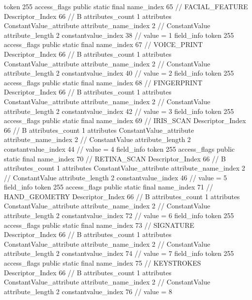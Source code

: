 {{{{{				token	255
				access_flags	public static final
				name_index	65		// FACIAL_FEATURE
				Descriptor_Index	66		// B
				attributes_count	1
				attributes {
				ConstantValue_attribute {
					attribute_name_index	2		// ConstantValue
					attribute_length	2
					constantvalue_index	38		// value = 1
				}
				}
			}
			field_info {
				token	255
				access_flags	public static final
				name_index	67		// VOICE_PRINT
				Descriptor_Index	66		// B
				attributes_count	1
				attributes {
				ConstantValue_attribute {
					attribute_name_index	2		// ConstantValue
					attribute_length	2
					constantvalue_index	40		// value = 2
				}
				}
			}
			field_info {
				token	255
				access_flags	public static final
				name_index	68		// FINGERPRINT
				Descriptor_Index	66		// B
				attributes_count	1
				attributes {
				ConstantValue_attribute {
					attribute_name_index	2		// ConstantValue
					attribute_length	2
					constantvalue_index	42		// value = 3
				}
				}
			}
			field_info {
				token	255
				access_flags	public static final
				name_index	69		// IRIS_SCAN
				Descriptor_Index	66		// B
				attributes_count	1
				attributes {
				ConstantValue_attribute {
					attribute_name_index	2		// ConstantValue
					attribute_length	2
					constantvalue_index	44		// value = 4
				}
				}
			}
			field_info {
				token	255
				access_flags	public static final
				name_index	70		// RETINA_SCAN
				Descriptor_Index	66		// B
				attributes_count	1
				attributes {
				ConstantValue_attribute {
					attribute_name_index	2		// ConstantValue
					attribute_length	2
					constantvalue_index	46		// value = 5
				}
				}
			}
			field_info {
				token	255
				access_flags	public static final
				name_index	71		// HAND_GEOMETRY
				Descriptor_Index	66		// B
				attributes_count	1
				attributes {
				ConstantValue_attribute {
					attribute_name_index	2		// ConstantValue
					attribute_length	2
					constantvalue_index	72		// value = 6
				}
				}
			}
			field_info {
				token	255
				access_flags	public static final
				name_index	73		// SIGNATURE
				Descriptor_Index	66		// B
				attributes_count	1
				attributes {
				ConstantValue_attribute {
					attribute_name_index	2		// ConstantValue
					attribute_length	2
					constantvalue_index	74		// value = 7
				}
				}
			}
			field_info {
				token	255
				access_flags	public static final
				name_index	75		// KEYSTROKES
				Descriptor_Index	66		// B
				attributes_count	1
				attributes {
				ConstantValue_attribute {
					attribute_name_index	2		// ConstantValue
					attribute_length	2
					constantvalue_index	76		// value = 8
}}}}}}}
